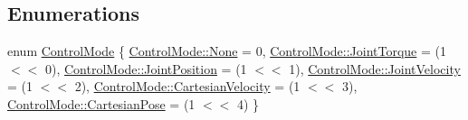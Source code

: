 \subsection*{Enumerations}
\begin{DoxyCompactItemize}
\item 
enum \hyperlink{namespacefranka__hw_afa416558ce4baace5ac6c71bd5d2c98c}{Control\+Mode} \{ \newline
\hyperlink{namespacefranka__hw_afa416558ce4baace5ac6c71bd5d2c98ca6adf97f83acf6453d4a6a4b1070f3754}{Control\+Mode\+::\+None} = 0, 
\hyperlink{namespacefranka__hw_afa416558ce4baace5ac6c71bd5d2c98ca6c640e0814bb12aecaa28d237d393467}{Control\+Mode\+::\+Joint\+Torque} = (1 $<$$<$ 0), 
\hyperlink{namespacefranka__hw_afa416558ce4baace5ac6c71bd5d2c98caa10d0bc4b1db478900a14e066c4c3333}{Control\+Mode\+::\+Joint\+Position} = (1 $<$$<$ 1), 
\hyperlink{namespacefranka__hw_afa416558ce4baace5ac6c71bd5d2c98cab71066787fa2ea98f88027078359cd93}{Control\+Mode\+::\+Joint\+Velocity} = (1 $<$$<$ 2), 
\newline
\hyperlink{namespacefranka__hw_afa416558ce4baace5ac6c71bd5d2c98ca5f4d2e0f06b2be984d61e898b354da1e}{Control\+Mode\+::\+Cartesian\+Velocity} = (1 $<$$<$ 3), 
\hyperlink{namespacefranka__hw_afa416558ce4baace5ac6c71bd5d2c98cab5a449319cc586903a8995a0b463df50}{Control\+Mode\+::\+Cartesian\+Pose} = (1 $<$$<$ 4)
 \}
\end{DoxyCompactItemize}
